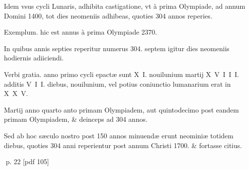 \begin{parnumbers}
Idem vsus cycli Lunaris, adhibita castigatione, vt à prima Olympiade, ad annum Domini 1400, tot dies neomeniis adhibeas, quoties 304 annos reperies.

Exemplum. hic est annus à prima Olympiade 2370.

In quibus annis septies reperitur  numerus 304. septem igitur dies neomeniis hodiernis adiiciendi.

Verbi gratia. anno primo cycli epactæ sunt X I. nouilunium martij X V I I I. additis V I I. diebus, nouilunium, vel potius coniunctio lumanarium erat in X X V.

Martij anno quarto anto primam Olympiadem, aut quintodecimo post eandem primam Olympiadem, \& deinceps ad 304 annos.

Sed ab hoc sæculo nostro post 150 annos minuendæ erunt neominiæ totidem diebus, quoties 304 anni reperientur post annum Christi 1700. \& fortasse citius.

\end{parnumbers}
\clearpage
p. 22 [pdf 105]

